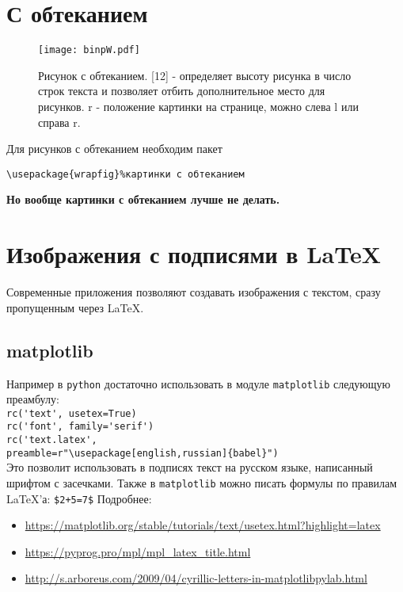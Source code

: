 \section{С обтеканием}
\lipsum[1-2]

\begin{wrapfigure}[12]{r}{0.45\linewidth} 

	\texttt{[image: binpW.pdf]}
	\caption{Рисунок с обтеканием. [12] - определяет высоту рисунка в число строк текста и позволяет отбить дополнительное место для рисунков. {r} - положение картинки на странице, можно слева {l} или справа {r}. 
	}
	\label{fig:image4}
\end{wrapfigure}


\lipsum[1-2]

Для рисунков с обтеканием необходим пакет

\verb|\usepackage{wrapfig}%картинки с обтеканием| 

\textbf{Но вообще картинки с обтеканием лучше не делать.}

\section{Изображения с подписями в \LaTeX}

Современные приложения позволяют создавать изображения с текстом, сразу пропущенным через \LaTeX. 

\subsection{matplotlib}
Например в \verb|python| достаточно использовать в модуле \verb|matplotlib| следующую преамбулу:\\
   \verb|rc('text', usetex=True)|\\
   \verb|rc('font', family='serif')|\\  
   \verb|rc('text.latex', |\\  
   \verb|preamble=r"\usepackage[english,russian]{babel}")|\\   


Это позволит использовать в подписях текст на русском языке, написанный шрифтом с засечками. Также в \verb|matplotlib| можно писать формулы по правилам \LaTeX'а: \verb*|$2+5=7$|
Подробнее:
\begin{itemize}
	\item \href{https://matplotlib.org/stable/tutorials/text/usetex.html?highlight=latex}{https://matplotlib.org/stable/tutorials/text/usetex.html?highlight=latex}
	\item \href{https://pyprog.pro/mpl/mpl_latex_title.html}{https://pyprog.pro/mpl/mpl\_latex\_title.html}
	\item \href{http://s.arboreus.com/2009/04/cyrillic-letters-in-matplotlibpylab.html}{http://s.arboreus.com/2009/04/cyrillic-letters-in-matplotlibpylab.html}
\end{itemize}


